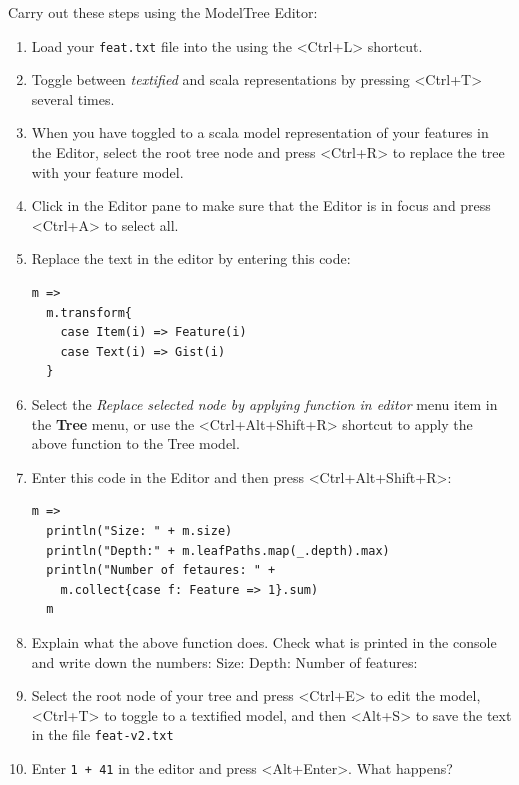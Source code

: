 \documentclass[11pt]{article}
\begin{document}
\begin{framed}
\noindent Carry out these steps using the ModelTree Editor:
\begin{enumerate}
\item Load your \verb+feat.txt+ file into the using the <Ctrl+L> shortcut.
\item Toggle between {\it textified} and scala representations by pressing <Ctrl+T> several times.
\item When you have toggled to a scala model representation of your features in the Editor, select the root tree node and press <Ctrl+R> to replace the tree with your feature model.
\item Click in the Editor pane to make sure that the Editor is in focus and press <Ctrl+A> to select all.
\item Replace the text in the editor by entering this code: {\scriptsize\begin{verbatim}
m =>
  m.transform{
    case Item(i) => Feature(i)
    case Text(i) => Gist(i)
  }
\end{verbatim}}



\item Select the {\it Replace selected node by applying function in editor} menu item in the {\bf Tree} menu, or use the <Ctrl+Alt+Shift+R> shortcut to apply the above function to the Tree model.


\item Enter this code in the Editor and then press <Ctrl+Alt+Shift+R>: {\scriptsize\begin{verbatim}
m =>
  println("Size: " + m.size)
  println("Depth:" + m.leafPaths.map(_.depth).max)
  println("Number of fetaures: " + 
    m.collect{case f: Feature => 1}.sum)
  m
\end{verbatim}}



\item Explain what the above function does. Check what is printed in the console and write down the numbers: 
\newline Size: \underline{\hspace{1cm}} Depth: \underline{\hspace{1cm}}  Number of features: \underline{\hspace{1cm}}

\item Select the root node of your tree and press <Ctrl+E> to edit the model,  <Ctrl+T> to toggle to a textified model, and then <Alt+S> to save the text in the file \verb+feat-v2.txt+


\item Enter \verb?1 + 41? in the editor and press <Alt+Enter>. What happens?
\end{enumerate}
\end{framed}
\end{document}
